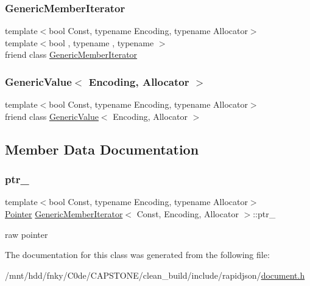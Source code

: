 \subsubsection{\texorpdfstring{Generic\+Member\+Iterator}{GenericMemberIterator}}
{\footnotesize\ttfamily template$<$bool Const, typename Encoding, typename Allocator$>$ \\
template$<$bool , typename , typename $>$ \\
friend class \hyperlink{classGenericMemberIterator}{Generic\+Member\+Iterator}\hspace{0.3cm}{\ttfamily [friend]}}

\mbox{\label{classGenericMemberIterator_a82bdd5798f1a5ac0e3e7ba4bd6938cfc}} 
\subsubsection{\texorpdfstring{Generic\+Value$<$ Encoding, Allocator $>$}{GenericValue< Encoding, Allocator >}}
{\footnotesize\ttfamily template$<$bool Const, typename Encoding, typename Allocator$>$ \\
friend class \hyperlink{classGenericValue}{Generic\+Value}$<$ Encoding, Allocator $>$\hspace{0.3cm}{\ttfamily [friend]}}



\subsection{Member Data Documentation}
\mbox{\label{classGenericMemberIterator_a86d045bb193c966d92655a73fe813548}} 
\subsubsection{\texorpdfstring{ptr\+\_\+}{ptr\_}}
{\footnotesize\ttfamily template$<$bool Const, typename Encoding, typename Allocator$>$ \\
\hyperlink{classGenericMemberIterator_ac0bd6e77617593892fc13afb00e62f29}{Pointer} \hyperlink{classGenericMemberIterator}{Generic\+Member\+Iterator}$<$ Const, Encoding, Allocator $>$\+::ptr\+\_\+\hspace{0.3cm}{\ttfamily [private]}}



raw pointer 



The documentation for this class was generated from the following file\+:\begin{DoxyCompactItemize}
\item 
/mnt/hdd/fnky/\+C0de/\+C\+A\+P\+S\+T\+O\+N\+E/clean\+\_\+build/include/rapidjson/\hyperlink{document_8h}{document.\+h}\end{DoxyCompactItemize}
